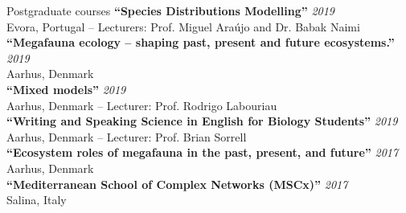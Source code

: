 \documentclass{resume} %
\begin{document}

\begin{rSection}{Postgraduate courses}
{\bf ``Species Distributions Modelling''} \hfill {\em 2019}\\
Evora, Portugal -- Lecturers: Prof. Miguel Ara\'{u}jo and Dr. Babak Naimi\\
{\bf ``Megafauna ecology -- shaping past, present and future ecosystems.''} \hfill {\em 2019}\\
Aarhus, Denmark\\
{\bf ``Mixed models''} \hfill {\em 2019}\\
Aarhus, Denmark -- Lecturer: Prof. Rodrigo Labouriau\\
{\bf ``Writing and Speaking Science in English for Biology Students''} \hfill {\em 2019} \\
Aarhus, Denmark -- Lecturer: Prof. Brian Sorrell \\
{\bf ``Ecosystem roles of megafauna in the past, present, and future''} \hfill {\em 2017}\\
Aarhus, Denmark\\
{\bf ``Mediterranean School of Complex Networks (MSCx)''} \hfill {\em 2017} \\
Salina, Italy
\end{rSection}
\end{document}
